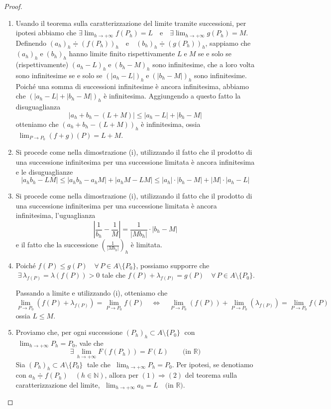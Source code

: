 \begin{proof}
\begin{enumerate}[labelindent=\parindent,leftmargin=*,label=\textnormal{(\roman*)},start=1]
\item Usando il teorema sulla caratterizzazione del limite tramite successioni, per ipotesi abbiamo che $\displaystyle \exists \lim_{h \longrightarrow +\infty} f(P_h) = L \quad \text{e} \quad \exists \lim_{h \longrightarrow +\infty} g(P_h) = M$. Definendo $(a_h)_h \doteqdot (f(P_h))_h \quad \text{e} \quad (b_h)_h \doteqdot (g(P_h))_h$, sappiamo che $(a_h)_h \; \text{e} \; (b_h)_h$ hanno limite finito rispettivamente $L \; \text{e} \; M$ se e solo se (rispettivamente) $(a_h - L)_h \; \text{e} \; (b_h - M)_h$ sono infinitesime, che a loro volta sono infinitesime se e solo se $(|a_h - L|)_h \; \text{e} \; (|b_h - M|)_h$ sono infinitesime. Poiché una somma di successioni infinitesime è ancora infinitesima, abbiamo che $(|a_h - L| + |b_h - M|)_h$ è infinitesima. Aggiungendo a questo fatto la disuguaglianza
$$|a_h + b_h - (L + M)| \leq |a_h - L| + |b_h - M|$$
otteniamo che $(a_h + b_h - (L + M))_h$ è infinitesima, ossia $\; \displaystyle \lim_{P \rightarrow P_0} (f + g)(P) = L + M$.
\item Si procede come nella dimostrazione (i), utilizzando il fatto che il prodotto di una successione infinitesima per una successione limitata è ancora infinitesima e le disuguaglianze
$$|a_h b_h - LM| \leq |a_hb_h - a_hM| + |a_hM - LM| \leq |a_h| \cdot |b_h - M| + |M| \cdot |a_h - L|$$
\item Si procede come nella dimostrazione (i), utilizzando il fatto che il prodotto di una successione infinitesima per una successione limitata è ancora infinitesima, l'uguaglianza
$$|\frac{1}{b_h} - \frac{1}{M}| = \frac{1}{|Mb_h|} \cdot |b_h - M|$$
e il fatto che la successione $\left( \frac{1}{|Mb_h|} \right)_h$ è limitata.
\item Poiché $f(P) \leq g(P) \quad \forall \, P \in A \setminus \lbrace P_0 \rbrace$, possiamo supporre che $\; \exists \, \lambda_{f(P)} = \lambda (f(P)) > 0$ tale che $f(P) + \lambda_{f(P)} = g(P) \quad \forall \, P \in A \setminus \lbrace P_0 \rbrace$.

Passando a limite e utilizzando (i), otteniamo che
$$ \lim_{P \rightarrow P_0} (f(P) + \lambda_{f(P)}) = \lim_{P \rightarrow P_0} f(P) \quad \Longleftrightarrow \quad \lim_{P \rightarrow P_0} (f(P)) + \lim_{P \rightarrow P_0} (\lambda_{f(P)}) = \lim_{P \rightarrow P_0} f(P)$$
ossia $L \leq M$.
\item Proviamo che, per ogni successione $(P_h)_h \subset A \setminus \lbrace P_0 \rbrace \;$ con $\; \displaystyle \lim_{h \rightarrow +\infty} P_h = P_0$, vale che
$$\exists \, \lim_{h \rightarrow +\infty} F(f(P_h)) = F(L) \qquad \text{(in } \mathbb{R} \text{)}$$
Sia $(P_h)_h \subset A \setminus \lbrace P_0 \rbrace \;$ tale che $\; \displaystyle \lim_{h \rightarrow +\infty} P_h = P_0$. Per ipotesi, se denotiamo con $a_h \doteqdot f(P_h) \quad (h \in \mathbb{N})$, allora per $(1) \Longrightarrow (2)$ del teorema sulla caratterizzazione del limite, $\; \displaystyle \lim_{h \rightarrow +\infty} a_h = L \quad \text{(in } \mathbb{R} \text{)}$.


\end{enumerate}
\end{proof}
